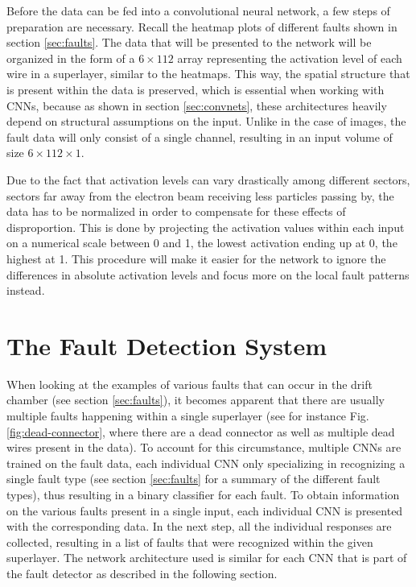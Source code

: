 Before the data can be fed into a convolutional neural network, a few
steps of preparation are necessary. Recall the heatmap plots of
different faults shown in section \ref{sec:faults}. The data that will
be presented to the network will be organized in the form of a \(6
\times 112\) array representing the activation level of each wire in a
superlayer, similar to the heatmaps. This way, the spatial structure
that is present within the data is preserved, which is essential when
working with CNNs, because as shown in section \ref{sec:convnets},
these architectures heavily depend on structural assumptions on the
input. Unlike in the case of images, the fault data will only consist
of a single channel, resulting in an input volume of size \(6
\times 112 \times 1\).

Due to the fact that activation levels can vary drastically among
different sectors, sectors far away from the electron beam receiving
less particles passing by, the data has to be normalized in order to
compensate for these effects of disproportion. This is done by projecting
the activation values within each input on a numerical scale between 0
and 1, the lowest activation ending up at 0, the highest at 1. This
procedure will make it easier for the network to ignore the
differences in absolute activation levels and focus more on the local
fault patterns instead.

\section{The Fault Detection System}

When looking at the examples of various faults that can occur in the
drift chamber (see section \ref{sec:faults}), it becomes apparent that
there are usually multiple faults happening within a single
superlayer (see for instance Fig. \ref{fig:dead-connector}, where
there are a dead connector as well as multiple dead wires present in
the data). To account for this circumstance, multiple CNNs are
trained on the fault data, each individual CNN only specializing in
recognizing a single fault type (see section \ref{sec:faults} for a
summary of the different fault types), thus
resulting in a binary classifier for each fault. To obtain information
on the various faults present in a single input, each individual CNN
is presented with the corresponding data. In the next step, all the
individual responses are collected, resulting in a list of faults that
were recognized within the given superlayer. The network architecture
used is similar for each CNN that is part of the fault detector as
described in the following section.

